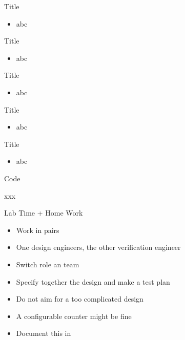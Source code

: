 \begin{frame}[fragile]{Title}
\begin{itemize}
\item abc
\end{itemize}
\end{frame}

\begin{frame}[fragile]{Title}
\begin{itemize}
\item abc
\end{itemize}
\end{frame}

\begin{frame}[fragile]{Title}
\begin{itemize}
\item abc
\end{itemize}
\end{frame}

\begin{frame}[fragile]{Title}
\begin{itemize}
\item abc
\end{itemize}
\end{frame}

\begin{frame}[fragile]{Title}
\begin{itemize}
\item abc
\end{itemize}
\end{frame}

\begin{frame}[fragile]{Code}
\begin{chisel}
xxx
\end{chisel}
\end{frame}


\begin{frame}[fragile]{Lab Time + Home Work}
\begin{itemize}
\item Work in pairs
\item One design engineers, the other verification engineer
\item Switch role an team
\item Specify together the design and make a test plan
\item Do not aim for a too complicated design
\item A configurable counter might be fine
\item Document this in 
\end{itemize}
\end{frame}

